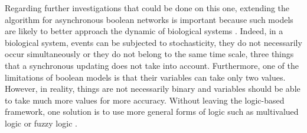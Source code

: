 \documentclass[oneside,a4paper,onecolumn,notitlepage]{article}
\begin{document}
Regarding further investigations that could be done on this one, extending the algorithm for asynchronous boolean networks is important because such models are likely to better approach the dynamic of biological systems \cite{saadatpour2010attractor}. Indeed, in a biological system, events can be subjected to stochasticity, they do not necessarily occur simultaneously or they do not belong to the same time scale, three things that a synchronous updating does not take into account. Furthermore, one of the limitations of boolean models is that their variables can take only two values. However, in reality, things are not necessarily binary and variables should be able to take much more values for more accuracy. Without leaving the logic-based framework, one solution is to use more general forms of logic such as multivalued logic or fuzzy logic \cite{zadeh1988fuzzy}.



\end{document}
